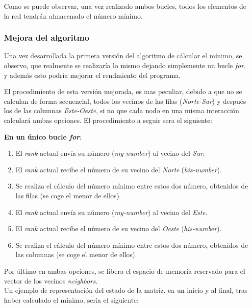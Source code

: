 \documentclass[11pt]{article}
\begin{document}



Como se puede observar, una vez realizado ambos bucles, todos los elementos de la red tendrán almacenado el número mínimo.


\subsubsection{Mejora del algoritmo}
Una vez desarrollada la primera versión del algoritmo de cálcular el mínimo, se observo, que realmente se realizaría lo mismo dejando simplemente un bucle \textit{for}, y además esto podría mejorar el rendmiento del programa.

El procedimiento de esta versión mejorada, es mas peculiar, debido a que no se calculan de forma secuencial, todos los vecinos de las filas (\textit{Norte-Sur}) y después los de las columnas \textit{Este-Oeste}, si no que cada nodo en una misma interacción calculará ambas opciones. El procedimiento a seguir sera el siguiente:

\textbf{En un único bucle \textit{for}}:
\begin{enumerate}
	\item El \textit{rank} actual envía su número (\textit{my-number}) al vecino del \textit{Sur}.
	\item El \textit{rank} actual recibe el número de su vecino del \textit{Norte} (\textit{his-number}).
	\item Se realiza el cálculo del número mínimo entre estos dos número, obtenidos de las filas (se coge el menor de ellos).
	\item El \textit{rank} actual envía su número (\textit{my-number}) al vecino del \textit{Este}.
	\item El \textit{rank} actual recibe el número de su vecino del \textit{Oeste} (\textit{his-number}).
	\item Se realiza el cálculo del número mínimo entre estos dos número, obtenidos de las columnas (se coge el menor de ellos).
\end{enumerate}



Por último en ambas opciones, se libera el espacio de memoria reservado para el vector de los vecinos \textit{neighbors}.
\\

Un ejemplo de representación del estado de la matriz, en un inicio y al final, tras haber calculado el mínimo, seria el siguiente:
\end{document}
